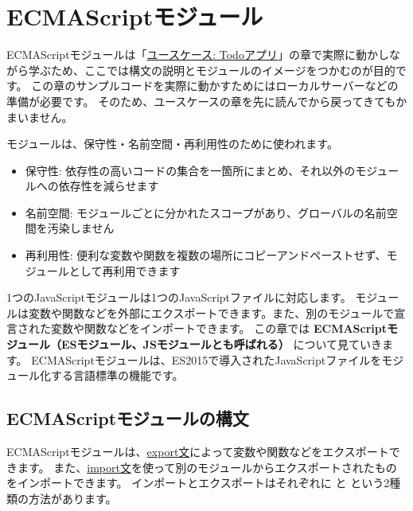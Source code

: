 \hypertarget{module}{%
\chapter[ECMAScriptモジュール]{ECMAScriptモジュール\protect{}}\label{module}}
\thispagestyle{frontheadings}

ECMAScriptモジュールは「\hyperlink{todo-app}{ユースケース: Todoアプリ}」の章で実際に動かしながら学ぶため、ここでは構文の説明とモジュールのイメージをつかむのが目的です。
この章のサンプルコードを実際に動かすためにはローカルサーバーなどの準備が必要です。
そのため、ユースケースの章を先に読んでから戻ってきてもかまいません。

モジュールは、保守性・名前空間・再利用性のために使われます。

\begin{itemize}
\item
  保守性:
  依存性の高いコードの集合を一箇所にまとめ、それ以外のモジュールへの依存性を減らせます
\item
  名前空間:
  モジュールごとに分かれたスコープがあり、グローバルの名前空間を汚染しません
\item
  再利用性:
  便利な変数や関数を複数の場所にコピーアンドペーストせず、モジュールとして再利用できます
\end{itemize}

1つのJavaScriptモジュールは1つのJavaScriptファイルに対応します。
モジュールは変数や関数などを外部にエクスポートできます。また、別のモジュールで宣言された変数や関数などをインポートできます。
この章では
\textbf{ECMAScriptモジュール（ESモジュール、JSモジュールとも呼ばれる）}
について見ていきます。
ECMAScriptモジュールは、ES2015で導入されたJavaScriptファイルをモジュール化する言語標準の機能です。

\hypertarget{es-module-syntax}{%
\section{ECMAScriptモジュールの構文}\label{es-module-syntax}}

ECMAScriptモジュールは、\href{https://developer.mozilla.org/ja/docs/Web/JavaScript/Reference/Statements/export}{export文}によって変数や関数などをエクスポートできます。
また、\href{https://developer.mozilla.org/ja/docs/Web/JavaScript/Reference/Statements/import}{import文}を使って別のモジュールからエクスポートされたものをインポートできます。
インポートとエクスポートはそれぞれに \textbf{} と
\textbf{}という2種類の方法があります。

